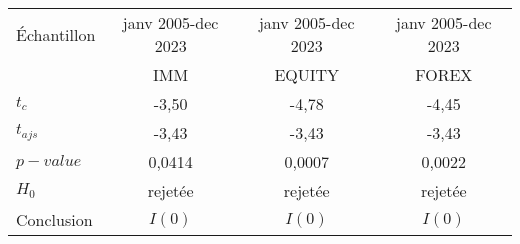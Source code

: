 \begin{tabular}{lccc}
\toprule
Échantillon & janv 2005-dec 2023 & janv 2005-dec 2023 & janv 2005-dec 2023 \\
      &  IMM &  EQUITY & FOREX \\  
\cmidrule(r){1-1} \cmidrule(lr){2-2}\cmidrule(l){3-3} \cmidrule(l){4-4}
    $t_c$        &  -3,50    &  -4,78 & -4,45    \\
    $t_{ajs}$    & -3,43   & -3,43    &  -3,43 \\
    $p-value$        & 0,0414   &  0,0007 & 0,0022      \\ 
    $H_0$        & rejetée & rejetée & rejetée \\
    Conclusion  & $I(0)$ & $I(0)$ & $I(0)$ \\
\bottomrule
\end{tabular}